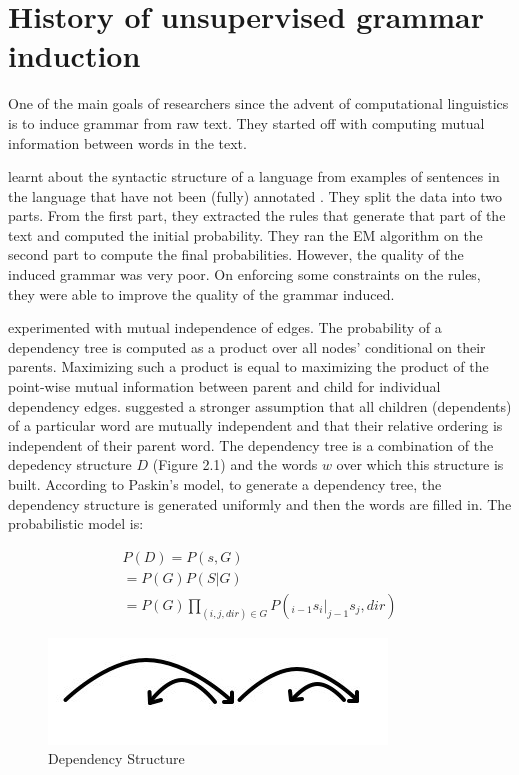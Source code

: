 \documentclass{book}
\begin{document}
\section{History of unsupervised grammar induction}

One of the main goals of researchers since the advent of computational linguistics is to induce grammar from raw text. They started off with computing mutual information between words in the text. \citep{vander1978} \citep{magerman1990}

\citep{carroll1992} learnt about the syntactic structure of a language from examples of sentences in the language that have not been (fully) annotated . They split the data into two parts. From the first part, they extracted the rules that generate that part of the text and computed the initial probability. They ran the EM algorithm on the second part to compute the final probabilities. However, the quality of the induced grammar was very poor. On enforcing some constraints on the rules, they were able to improve the quality of the grammar induced. 

\citep{yuret1998} experimented with mutual independence of edges. The probability of a dependency tree is computed as a product over all nodes’ conditional on their parents. Maximizing such a product is equal to maximizing the product of the point-wise mutual information between parent and child for individual dependency edges. \citep{paskin2002} suggested a stronger assumption that all children (dependents) of a particular word are mutually independent and that their relative ordering is independent of their parent word. The dependency tree is a combination of the depedency structure $D$ (Figure 2.1) and the words $w$ over which this structure is built. According to Paskin's model, to generate a dependency tree, the dependency structure is generated uniformly and then the words are filled in. The probabilistic model is: 

\begin{gather*}
P(D) = P(s,G) \\ 
     = P(G)P(S|G)\\
     = P(G) \prod_{(i,j,dir) \in G} P(_{i-1}s_{i}|_{j-1}s_{j},dir)
\end{gather*}


\begin{figure}[!ht]
\centering
\includegraphics[width=90mm]{images/dep_structure.jpg}
\caption{Dependency Structure}
\label{overflow}
\end{figure}
\end{document}
